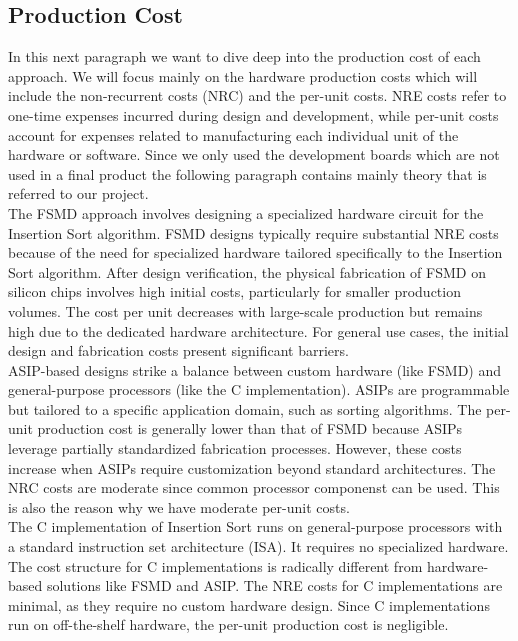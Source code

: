 \documentclass[conference]{IEEEtran}
\begin{document}
\subsection{Production Cost}
In this next paragraph we want to dive deep into the production cost of each approach. We will focus mainly on the hardware production costs which will include the non-recurrent costs (NRC) and the per-unit costs. NRE costs refer to one-time expenses incurred during design and development, while per-unit costs account for expenses related to manufacturing each individual unit of the hardware or software. Since we only used the development boards which are not used in a final product the following paragraph contains mainly theory that is referred to our project.\\
The FSMD approach involves designing a specialized hardware circuit for the Insertion Sort algorithm. FSMD designs typically require substantial NRE costs because of the need for specialized hardware tailored specifically to the Insertion Sort algorithm. After design verification, the physical fabrication of FSMD on silicon chips involves high initial costs, particularly for smaller production volumes. The cost per unit decreases with large-scale production but remains high due to the dedicated hardware architecture. For general use cases, the initial design and fabrication costs present significant barriers.\\
ASIP-based designs strike a balance between custom hardware (like FSMD) and general-purpose processors (like the C implementation). ASIPs are programmable but tailored to a specific application domain, such as sorting algorithms. The per-unit production cost is generally lower than that of FSMD because ASIPs leverage partially standardized fabrication processes. However, these costs increase when ASIPs require customization beyond standard architectures. The NRC costs are moderate since common processor componenst can be used. This is also the reason why we have moderate per-unit costs.\\
The C implementation of Insertion Sort runs on general-purpose processors with a standard instruction set architecture (ISA). It requires no specialized hardware. The cost structure for C implementations is radically different from hardware-based solutions like FSMD and ASIP. The NRE costs for C implementations are minimal, as they require no custom hardware design. Since C implementations run on off-the-shelf hardware, the per-unit production cost is negligible. 
\end{document}
